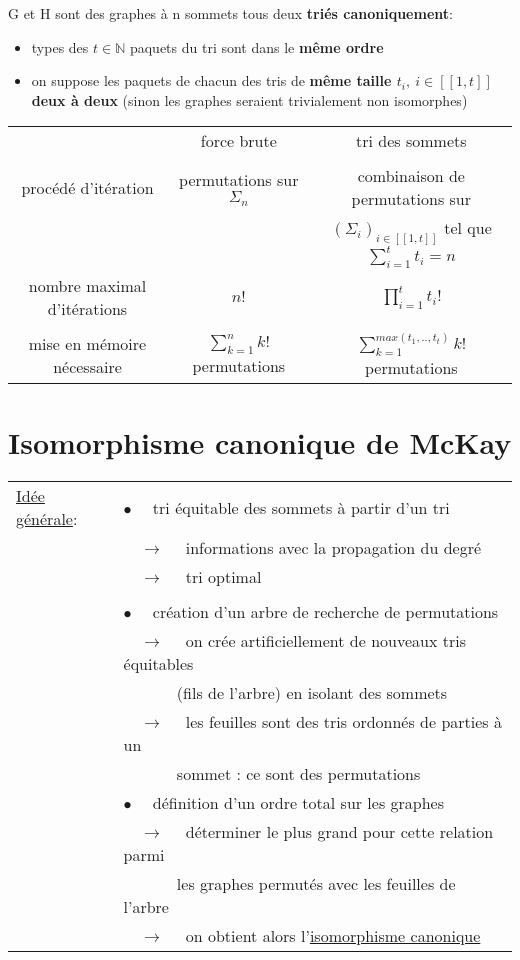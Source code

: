 \documentclass[a4paper, french, twoside]{article}
\begin{document}
G et H sont des graphes à n sommets tous deux \textbf{triés canoniquement}:
\begin{itemize}
    \item types des $t \in \mathbb{N}$ paquets du tri sont dans le \textbf{même ordre} 
    \item on suppose les paquets de chacun des tris de \textbf{même taille $t_i,\ i \in [\![1,t]\!]$ deux à deux} (sinon les graphes seraient trivialement non isomorphes)
    \newline 
\end{itemize} 
\begin{center}
\begin{tabular}{ccc}
    & force brute & tri des sommets \\ & & \\
    procédé d'itération & permutations sur $\Sigma_n$ & combinaison de permutations sur \\
    & & $(\Sigma_i)_{i \in [\![1,t]\!]}$ tel que $\sum_{i=1}^t t_i  = n$ \\
    nombre maximal d'itérations & $n!$ & $\prod_{i=1}^t t_i!$ \\
    & & \\
    mise en mémoire nécessaire & $\sum_{k=1}^n k! $ permutations & $\sum_{k=1}^{max(t_1,..,t_t)} k! $ permutations \\
\end{tabular}
\end{center} \normalsize

\section{Isomorphisme canonique de McKay \cite{mckay}}
\begin{tabular}{ll}
\underline{Idée générale}: & $\bullet \quad$ tri équitable des sommets à partir d'un tri \\
& $\quad \rightarrow \quad$ informations avec la propagation du degré \\
& $\quad \rightarrow \quad$ tri optimal \\
& \\
& $\bullet \quad$ création d'un arbre de recherche de permutations \\
& $\quad \rightarrow \quad$ on crée artificiellement de nouveaux tris équitables \\
& $\qquad \quad$ (fils de l'arbre) en isolant des sommets \\
& $\quad \rightarrow \quad$ les feuilles sont des tris ordonnés de parties à un \\ 
& $\qquad \quad$ sommet : ce sont des permutations \\
& $\bullet \quad$ définition d'un ordre total sur les graphes \\
& $\quad \rightarrow \quad$ déterminer le plus grand pour cette relation parmi \\
& $\qquad \quad$ les graphes permutés avec les feuilles de l'arbre \\
& $\quad \rightarrow \quad$ on obtient alors l'\underline{isomorphisme canonique}
\end{tabular}
\end{document}
